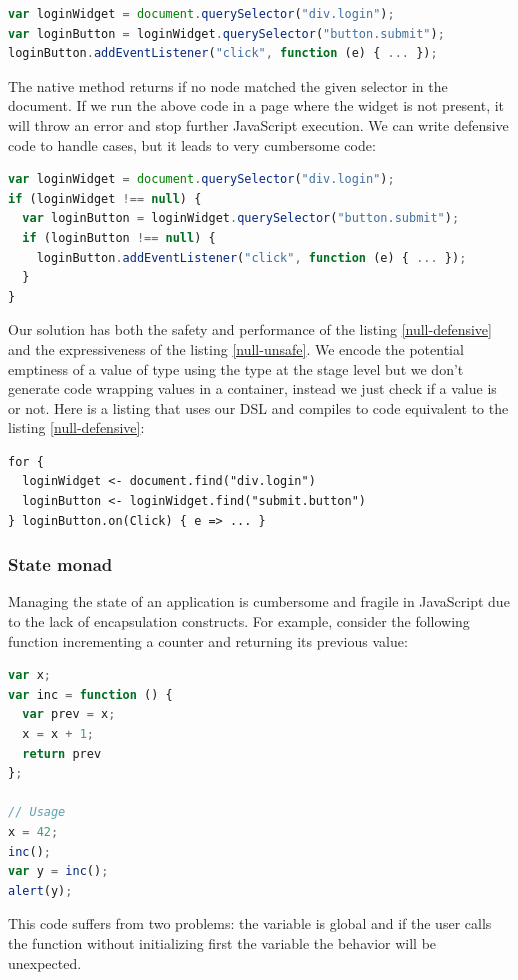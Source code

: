 \documentclass[american,english,runningheads]{llncs}
\begin{document}
\begin{lstlisting}[language=JavaScript,label=null-unsafe,caption=Unsafe code]
var loginWidget = document.querySelector("div.login");
var loginButton = loginWidget.querySelector("button.submit");
loginButton.addEventListener("click", function (e) { ... });
\end{lstlisting}

The native  method returns  if no node matched the given selector in the document. If we run the above code in a page where the widget is not present, it will throw an error and stop further JavaScript execution. We can write defensive code to handle  cases, but it leads to very cumbersome code:

\begin{lstlisting}[language=JavaScript,label=null-defensive,caption=Defensive programming to handle null references]
var loginWidget = document.querySelector("div.login");
if (loginWidget !== null) {
  var loginButton = loginWidget.querySelector("button.submit");
  if (loginButton !== null) {
    loginButton.addEventListener("click", function (e) { ... });
  }
}
\end{lstlisting}

Our solution has both the safety and performance of the listing \ref{null-defensive} and the expressiveness of the listing \ref{null-unsafe}. We encode the potential emptiness of a value of type  using the  type at the stage level but we don’t generate code wrapping values in a container, instead we just check if a value is  or not. Here is a listing that uses our DSL and compiles to code equivalent to the listing \ref{null-defensive}:

\begin{lstlisting}
for {
  loginWidget <- document.find("div.login")
  loginButton <- loginWidget.find("submit.button")
} loginButton.on(Click) { e => ... }
\end{lstlisting}

\subsubsection{State monad}

Managing the state of an application is cumbersome and fragile in JavaScript due to the lack of encapsulation constructs. For example, consider the following function incrementing a counter and returning its previous value:
\begin{lstlisting}[language=JavaScript,label=state-fragile,caption=Fragile state handling]
var x;
var inc = function () {
  var prev = x;
  x = x + 1;
  return prev
};

// Usage
x = 42;
inc();
var y = inc();
alert(y);
\end{lstlisting}
This code suffers from two problems: the variable  is global and if the user calls the  function without initializing first the  variable the behavior will be unexpected.
\end{document}
